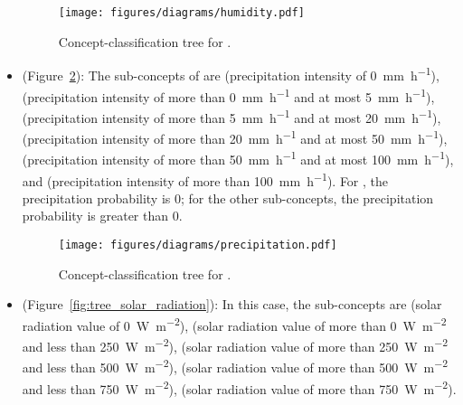 \begin{itemize}
  \begin{figure}
    \centering
    \texttt{[image: figures/diagrams/humidity.pdf]}
    \caption[Concept-classification tree for ]{Concept-classification tree for .}
    \label{fig:tree_humidity}
  \end{figure}

  \item {} (Figure~\ref{fig:tree_precipitation}): The sub-concepts of  are  (precipitation intensity of \SI{0}{\milli\metre\per\hour}),  (precipitation intensity of more than \SI{0}{\milli\metre\per\hour} and at most \SI{5}{\milli\metre\per\hour}),  (precipitation intensity of more than \SI{5}{\milli\metre\per\hour} and at most \SI{20}{\milli\metre\per\hour}),  (precipitation intensity of more than \SI{20}{\milli\metre\per\hour} and at most \SI{50}{\milli\metre\per\hour}),  (precipitation intensity of more than \SI{50}{\milli\metre\per\hour} and at most \SI{100}{\milli\metre\per\hour}), and  (precipitation intensity of more than \SI{100}{\milli\metre\per\hour}). For , the precipitation probability is \num{0}; for the other sub-concepts, the precipitation probability is greater than \num{0}.
  
  \begin{figure}
    \centering
    \texttt{[image: figures/diagrams/precipitation.pdf]}
    \caption[Concept-classification tree for ]{Concept-classification tree for .}
    \label{fig:tree_precipitation}
  \end{figure}
  
  \item {} (Figure~\ref{fig:tree_solar_radiation}): In this case, the sub-concepts are  (solar radiation value of \SI{0}{\watt\per\square\meter}),  (solar radiation value of more than \SI{0}{\watt\per\square\meter} and less than \SI{250}{\watt\per\square\meter}),  (solar radiation value of more than \SI{250}{\watt\per\square\meter} and less than \SI{500}{\watt\per\square\meter}),  (solar radiation value of more than \SI{500}{\watt\per\square\meter} and less than \SI{750}{\watt\per\square\meter}),  (solar radiation value of more than \SI{750}{\watt\per\square\meter}).
  

\end{itemize}

